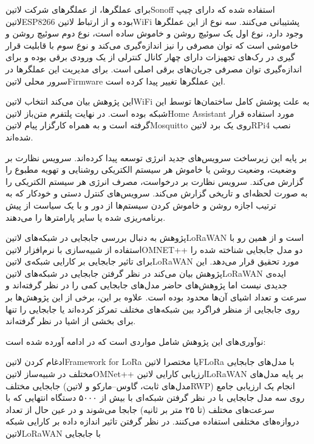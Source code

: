 برای عملگرها، از عملگرهای شرکت ‌لاتین{Sonoff} استفاده شده که دارای چیپ ‌لاتین{ESP8266} بوده و از ارتباط ‌لاتین{WiFi} پشتیبانی می‌کنند.
سه نوع از این عملگرها وجود دارد، نوع اول یک سوئیچ روشن و خاموش ساده است، نوع دوم سوئیچ روشن و خاموشی است که توان مصرفی را نیز اندازه‌گیری می‌کند و
نوع سوم با قابلیت قرار گیری در رک‌های تجهیزات دارای چهار کانال کنترلی از یک ورودی برقی بوده و برای اندازه‌گیری توان مصرفی جریان‌های برقی اصلی است.
برای مدیریت این عملگرها در سرور محلی ‌لاتین{Firmware} این عملگرها تغییر پیدا کرده است.

این پژوهش بیان می‌کند انتخاب ‌لاتین{WiFi} به علت پوشش کامل ساختمان‌ها توسط این شبکه بوده است.
در نهایت پلتفرم متن‌باز ‌لاتین{Home Assistant} مورد استفاده قرار گرفته است و به همراه کارگزار پیام ‌لاتین{Mosquitto} روی یک برد ‌لاتین{RPi4}
نصب شده‌اند.

بر پایه این زیرساخت سرویس‌های جدید انرژی توسعه پیدا کرده‌اند. سرویس نظارت بر وضعیت، وضعیت روشن یا خاموش هر سیستم الکتریکی روشنایی و تهویه مطبوع را
گزارش می‌کند. سرویس نظارت بر درخواست، مصرف انرژی هر سیستم الکتریکی را به صورت لحظه‌ای و تاریخی گزارش می‌کند. سرویس‌های کنترل دستی و خودکار که به ترتیب
اجازه روشن و خاموش کردن سیستم‌ها از دور و با یک سیاست از پیش برنامه‌ریزی شده یا سایر پارامترها را می‌دهند.



پژوهش  به دنبال بررسی جابجایی در شبکه‌های ‌لاتین{LoRaWAN} است و از همین رو با استفاده از شبیه‌سازی با نرم‌افزار ‌لاتین{OMNET++}
دو مدل جابجایی شناخته شده را برای تاثیر جابجایی بر کارایی شبکه‌ی ‌لاتین{LoRaWAN} مورد تحقیق قرار می‌دهد. این پژوهش بیان می‌کند در نظر گرفتن جابجایی در شبکه‌های
‌لاتین{LoRaWAN} ایده‌ی جدیدی نیست اما پژوهش‌های حاضر مدل‌های جابجایی کمی را در نظر گرفته‌اند و سرعت و تعداد اشیای آن‌ها محدود بوده است.
علاوه بر این، برخی از این پژوهش‌ها بر روی جابجایی از منظر فراگرد بین شبکه‌های مختلف تمرکز کرده‌اند یا جابجایی را تنها برای بخشی از اشیا در نظر گرفته‌اند.

نوآوری‌های این پژوهش شامل مواردی است که در ادامه آورده شده است:

 ادغام کردن ‌لاتین{Framework for LoRa} یا مختصرا ‌لاتین{FLoRa} با مدل‌های جابجایی مختلف در شبیه‌ساز ‌لاتین{OMNet++}
 ارزیابی کارایی ‌لاتین{LoRaWAN} بر پایه مدل‌های جابجایی مختلف (مدل‌های ثابت، گاوس--مارکو و ‌لاتین{RWP})
 انجام یک ارزیابی جامع روی سه مدل جابجایی با در نظر گرفتن شبکه‌ای با بیش از ۵۰۰۰ دستگاه انتهایی که با سرعت‌های مختلف (تا ۲۵ متر بر ثانیه) جابجا می‌شوند و در عین حال از تعداد
دروازه‌های مختلفی استفاده می‌کنند.
 در نظر گرفتن تاثیر اندازه داده بر کارایی شبکه ‌لاتین{LoRaWAN} با جابجایی

